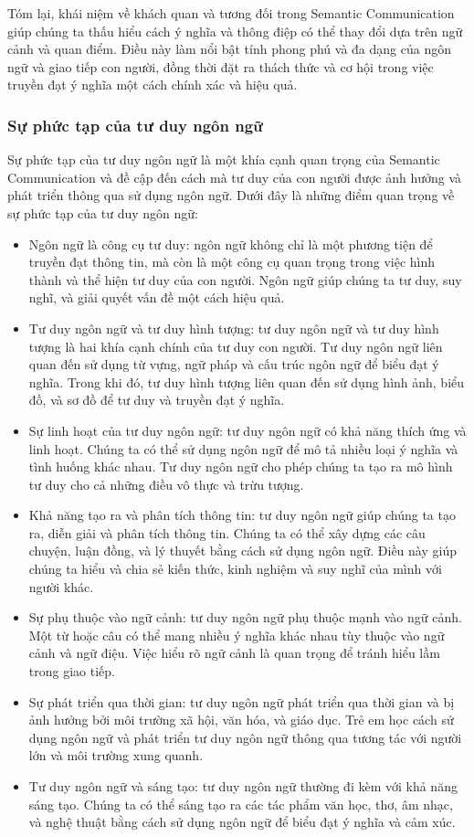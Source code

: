 \documentclass{article} %
\begin{document}
Tóm lại, khái niệm về khách quan và tương đối trong Semantic Communication giúp chúng ta thấu hiểu cách ý nghĩa và thông điệp có thể thay đổi dựa trên ngữ cảnh và quan điểm. Điều này làm nổi bật tính phong phú và đa dạng của ngôn ngữ và giao tiếp con người, đồng thời đặt ra thách thức và cơ hội trong việc truyền đạt ý nghĩa một cách chính xác và hiệu quả.

\subsubsection{Sự phức tạp của tư duy ngôn ngữ}
Sự phức tạp của tư duy ngôn ngữ là một khía cạnh quan trọng của Semantic Communication và đề cập đến cách mà tư duy của con người được ảnh hưởng và phát triển thông qua sử dụng ngôn ngữ. Dưới đây là những điểm quan trọng về sự phức tạp của tư duy ngôn ngữ:

\begin{itemize}

\item Ngôn ngữ là công cụ tư duy: ngôn ngữ không chỉ là một phương tiện để truyền đạt thông tin, mà còn là một công cụ quan trọng trong việc hình thành và thể hiện tư duy của con người. Ngôn ngữ giúp chúng ta tư duy, suy nghĩ, và giải quyết vấn đề một cách hiệu quả.
\item Tư duy ngôn ngữ và tư duy hình tượng: tư duy ngôn ngữ và tư duy hình tượng là hai khía cạnh chính của tư duy con người. Tư duy ngôn ngữ liên quan đến sử dụng từ vựng, ngữ pháp và cấu trúc ngôn ngữ để biểu đạt ý nghĩa. Trong khi đó, tư duy hình tượng liên quan đến sử dụng hình ảnh, biểu đồ, và sơ đồ để tư duy và truyền đạt ý nghĩa.
\item Sự linh hoạt của tư duy ngôn ngữ: tư duy ngôn ngữ có khả năng thích ứng và linh hoạt. Chúng ta có thể sử dụng ngôn ngữ để mô tả nhiều loại ý nghĩa và tình huống khác nhau. Tư duy ngôn ngữ cho phép chúng ta tạo ra mô hình tư duy cho cả những điều vô thực và trừu tượng.
\item Khả năng tạo ra và phân tích thông tin: tư duy ngôn ngữ giúp chúng ta tạo ra, diễn giải và phân tích thông tin. Chúng ta có thể xây dựng các câu chuyện, luận đồng, và lý thuyết bằng cách sử dụng ngôn ngữ. Điều này giúp chúng ta hiểu và chia sẻ kiến thức, kinh nghiệm và suy nghĩ của mình với người khác.
\item Sự phụ thuộc vào ngữ cảnh: tư duy ngôn ngữ phụ thuộc mạnh vào ngữ cảnh. Một từ hoặc câu có thể mang nhiều ý nghĩa khác nhau tùy thuộc vào ngữ cảnh và ngữ điệu. Việc hiểu rõ ngữ cảnh là quan trọng để tránh hiểu lầm trong giao tiếp.
\item Sự phát triển qua thời gian: tư duy ngôn ngữ phát triển qua thời gian và bị ảnh hưởng bởi môi trường xã hội, văn hóa, và giáo dục. Trẻ em học cách sử dụng ngôn ngữ và phát triển tư duy ngôn ngữ thông qua tương tác với người lớn và môi trường xung quanh.
\item Tư duy ngôn ngữ và sáng tạo: tư duy ngôn ngữ thường đi kèm với khả năng sáng tạo. Chúng ta có thể sáng tạo ra các tác phẩm văn học, thơ, âm nhạc, và nghệ thuật bằng cách sử dụng ngôn ngữ để biểu đạt ý nghĩa và cảm xúc.

\end{itemize}
\end{document}
